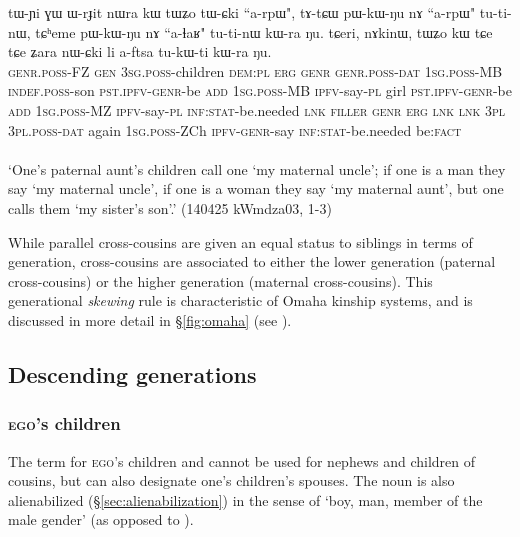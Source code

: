 \begin{exe}
\ex \label{ex:MBCh.FZCh}
\gll tɯ-ɲi ɣɯ ɯ-rɟit nɯra kɯ tɯʑo tɯ-ɕki ``a-rpɯ", tɤ-tɕɯ pɯ-kɯ-ŋu nɤ ``a-rpɯ" tu-ti-nɯ, tɕʰeme pɯ-kɯ-ŋu nɤ ``a-ɬaʁ" tu-ti-nɯ kɯ-ra ŋu. tɕeri, nɤkinɯ, tɯʑo kɯ tɕe tɕe ʑara nɯ-ɕki li a-ftsa tu-kɯ-ti kɯ-ra ŋu. \\
\textsc{genr}.\textsc{poss}-FZ \textsc{gen} \textsc{3sg}.\textsc{poss}-children \textsc{dem}:\textsc{pl} \textsc{erg} \textsc{genr} \textsc{genr}.\textsc{poss}-\textsc{dat} \textsc{1sg}.\textsc{poss}-MB \textsc{indef}.\textsc{poss}-son \textsc{pst}.\textsc{ipfv}-\textsc{genr}-be \textsc{add} \textsc{1sg}.\textsc{poss}-MB \textsc{ipfv}-say-\textsc{pl} girl \textsc{pst}.\textsc{ipfv}-\textsc{genr}-be \textsc{add} \textsc{1sg}.\textsc{poss}-MZ \textsc{ipfv}-say-\textsc{pl} \textsc{inf}:\textsc{stat}-be.needed \textsc{lnk} \textsc{filler} \textsc{genr} \textsc{erg} \textsc{lnk} \textsc{lnk} \textsc{3pl} \textsc{3pl}.\textsc{poss}-\textsc{dat} again \textsc{1sg}.\textsc{poss}-ZCh \textsc{ipfv}-\textsc{genr}-say \textsc{inf}:\textsc{stat}-be.needed be:\textsc{fact} \\
\\
\glt `One's paternal aunt's children call one  `my maternal uncle'; if one is a man they say `my maternal uncle', if one is a woman they say  `my maternal aunt', but one calls them  `my sister's son'.' (140425 kWmdza03, 1-3)
\end{exe}

While parallel cross-cousins are given an equal status to siblings in terms of generation, cross-cousins are associated to either the lower generation (paternal cross-cousins) or the higher generation (maternal cross-cousins). This generational \textit{skewing} rule is characteristic of Omaha kinship systems, and is discussed in more detail in §\ref{fig:omaha} (see ).

\subsection{Descending generations} \label{sec:G-1}

\subsubsection{\textsc{ego}'s children}
The term for \textsc{ego}'s children  and  cannot be used for nephews and children of cousins, but can also designate one's children's spouses. The noun  is also alienabilized (§\ref{sec:alienabilization}) in the sense of `boy, man, member of the male gender' (as opposed to ).


